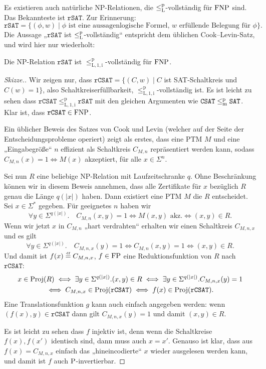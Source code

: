 Es existieren auch natürliche NP-Relationen, die $\leqlp$-vollständig für $\FNP$ sind.
Das Bekannteste ist $\mathtt{rSAT}$. Zur Erinnerung:
\[ \mathtt{rSAT} = \{ (\phi, w) \mid \text{$\phi$ ist eine aussagenlogische Formel, $w$ erfüllende Belegung für $\phi$} \}. \]
Die Aussage „$\mathtt{rSAT}$ ist $\leqlp$-vollständig“ entspricht dem üblichen Cook–Levin-Satz, und wird hier nur wiederholt:
\begin{theorem}
    Die NP-Relation $\mathtt{rSAT}$ ist $\leq_\mathrm{L,1,i}^\mathrm p$-vollständig für $\FNP$.
\end{theorem}
\begin{proof}[Skizze.]
    Wir zeigen nur, dass $\mathtt{rCSAT}=\{(C, w) \mid C$ ist SAT-Schaltkreis und $C(w)=1\}$, also Schaltkreiserfüllbarkeit, $\leq_\mathrm{L,1,i}^\mathrm p$-vollständig ist. Es ist leicht zu sehen dass $\mathtt{rCSAT}\leq_\mathrm{L,1,i}^\mathrm p \mathtt{rSAT}$ mit den gleichen Argumenten wie $\mathtt{CSAT}\leqmp \mathtt{SAT}$. Klar ist, dass $\mathtt{rCSAT}\in\FNP$.

    Ein üblicher Beweis des Satzes von Cook und Levin (welcher auf der Seite der Entscheidungsprobleme operiert) zeigt als erstes, dass eine PTM $M$ und eine „Eingabegröße“ $n$ effizient als Schaltkreis $C_{M,n}$ repräsentiert werden kann, sodass $C_{M,n}(x)=1 \iff M(x)$ akzeptiert, für alle $x\in\Sigma^{n}$.

    Sei nun $R$ eine beliebige NP-Relation mit Laufzeitschranke $q$. Ohne Beschränkung können wir in diesem Beweis annehmen, dass alle Zertifikate für $x$ bezüglich $R$ genau die Länge $q(|x|)$ haben. Dann existiert eine PTM $M$ die $R$ entscheidet. Sei $x\in\Sigma^*$ gegeben. Für geeignetes $n$ haben wir
    \[ \forall y\in\Sigma^{q(|x|)}.\quad C_{M,n}(x,y)=1 \iff M(x,y)\text{ akz.} \iff (x,y)\in R. \]
    Wenn wir jetzt $x$ in $C_{M,n}$ „hart verdrahten“ erhalten wir einen Schaltkreis $C_{M,n,x}$ und es gilt
    \[ \forall y\in\Sigma^{q(|x|)}.\quad C_{M,n,x}(y)=1 \iff C_{M,n}(x,y)=1 \iff (x,y)\in R. \]
    Und damit ist $f(x) \defeq C_{M,n,x}$, $f\in\FP$ eine Reduktionsfunktion von $R$ nach $\mathtt{rCSAT}$:
    \begin{gather*}
    x\in \Proj(R) \iff \exists  y\in\Sigma^{q(|x|)}.(x,y)\in R \iff \exists y\in\Sigma^{q(|x|)}.C_{M,n,x}(y)=1 \\\iff C_{M,n,x}\in\Proj(\mathtt{rCSAT}) \iff f(x)\in\Proj(\mathtt{rCSAT}). \end{gather*}
    Eine Translationsfunktion $g$ kann auch einfach angegeben werden: wenn $(f(x), y)\in \mathtt{rCSAT}$ dann gilt $C_{M,n,x}(y)=1$ und damit  $(x,y)\in R$.

    Es ist leicht zu sehen dass $f$ injektiv ist, denn wenn die Schaltkreise $f(x), f(x')$ identisch sind, dann muss auch $x=x'$. Genauso ist klar, dass aus $f(x)=C_{M,n,x}$ einfach das „hineincodierte“ $x$ wieder ausgelesen werden kann, und damit ist $f$ auch $\P$-invertierbar.
\end{proof}

